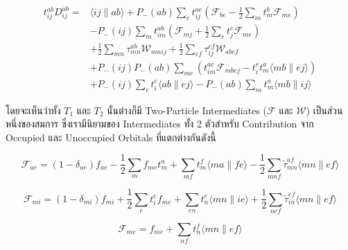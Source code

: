 \begin{equation}
  \label{eq:doubles_cluster_operator}
  \begin{aligned}
    t_{i j}^{a b} D_{i j}^{a b}
    =
     & \langle i j \| a b\rangle+P_{-}(a b) \sum_e t_{i j}^{a e}\left(\mathscr{F}_{b e}
    - \frac{1}{2} \sum_m t_m^b \mathscr{F}_{m e}\right)                                                             \\
     & - P_{-}(i j) \sum_m t_{i m}^{a b}\left(\mathscr{F}_{m j} + \frac{1}{2} \sum_e t_j^e \mathscr{F}_{m e}\right) \\
     & + \frac{1}{2} \sum_{m n} \tau_{m n}^{a b} \mathscr{W}_{m n i j}
    + \frac{1}{2} \sum_{e f} \tau_{i j}^{e f} \mathscr{W}_{a b e f}                                                 \\
     & + P_{-}(i j) P_{-}(a b) \sum_{m e}\left(t_{i m}^{a c} \mathscr{F}_{m b e j}
    - t_i^e t_m^a\langle m b \| e j\rangle\right)                                                                   \\
     & + P_{-}(i j) \sum_c t_i^e\langle a b \| e j\rangle-P_{-}(a b) \sum_m t_m^a\langle m b \| i j\rangle
  \end{aligned}
\end{equation}

\noindent โดยจะเห็นว่าทั้ง $T_{1}$ และ $T_{2}$ นั้นต่างก็มี Two-Particle Intermediates ($\mathscr{F}$ และ $\mathscr{W}$)
เป็นส่วนหนึ่งของสมการ ซึ่งเรามีนิยามของ Intermediates ทั้ง 2 ตัวสำหรับ Contribution จาก Occupied และ Unoccupied Orbitals
ที่แตกต่างกันดังนี้

\begin{equation}
  \label{eq:F_ae}
  \mathscr{F}_{a e}
  = \left(1-\delta_{a e}\right) f_{a e}-\frac{1}{2} \sum_m f_{m e} t_m^a
  + \sum_{m f} t_m^f\langle m a \| f e\rangle
  - \frac{1}{2} \sum_{m n f} \tilde{\tau}_{m n}^{a f}\langle m n \| e f\rangle
\end{equation}

\begin{equation}
  \label{eq:F_mi}
  \mathscr{F}_{m i}
  = \left(1-\delta_{m i}\right) f_{m i}+\frac{1}{2} \sum_e t_i^e f_{m e}
  + \sum_{e n} t_n^e\langle m n \| i e\rangle
  + \frac{1}{2} \sum_{n e f} \tilde{\tau}_{i n}^{e f}\langle m n \| e f\rangle
\end{equation}

\begin{equation}
  \label{eq:F_me}
  \mathscr{F}_{m e}
  =
  f_{m e}+\sum_{n f} t_n^f\langle m n \| e f\rangle
\end{equation}

